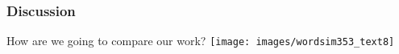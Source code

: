 \begin{frame}
\frametitle{Discussion}
How are we going to compare our work? 
\texttt{[image: images/wordsim353\_text8]}
\end{frame}